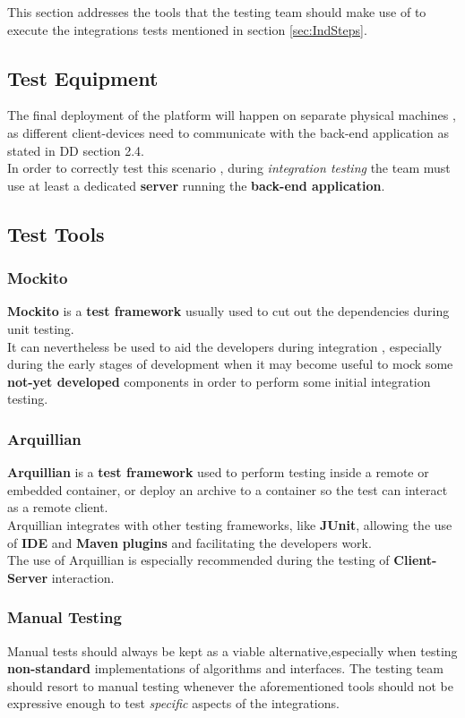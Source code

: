 This section addresses the tools that the testing team should make use of to execute the integrations tests mentioned in section \ref{sec:IndSteps}.

\subsection{Test Equipment}
The final deployment of the platform will happen on separate physical machines , as different client-devices need to communicate with the back-end application as stated in DD section 2.4.\\
In order to correctly test this scenario , during \emph{integration testing} the team must use at least a dedicated \textbf{server} running the \textbf{back-end application}.

\subsection{Test Tools}
\subsubsection{Mockito}
\textbf{Mockito} is a \textbf{test framework} usually used to cut out the dependencies during unit testing.\\
It can nevertheless be used to aid the developers during integration , especially during the early stages of development when it may become useful to mock some \textbf{not-yet developed} components in order to perform some initial integration testing.
\subsubsection{Arquillian}
\textbf{Arquillian} is a \textbf{test framework} used to perform testing inside a remote or embedded container, or deploy an archive to a container so the test can interact as a remote client.\\
Arquillian integrates with other testing frameworks, like \textbf{JUnit}, allowing the use of \textbf{IDE} and \textbf{Maven} \textbf{plugins} and facilitating the developers work.\\
The use of Arquillian is especially recommended during the testing of \textbf{Client-Server} interaction.

\subsubsection{Manual Testing}
Manual tests should always be kept as a viable alternative,especially when testing \textbf{non-standard} implementations of algorithms and interfaces.
The testing team should resort to manual testing whenever the aforementioned tools should not be expressive enough to test \emph{specific} aspects of the integrations.

